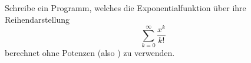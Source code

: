 \begin{aufg}
  Schreibe ein Programm, welches die Exponentialfunktion 
  über ihre Reihendarstellung
  \begin{equation}
    \sum_{k=0}^\infty \frac{x^k}{k!}
  \end{equation}
  berechnet ohne Potenzen (also ) zu verwenden.
\end{aufg}
